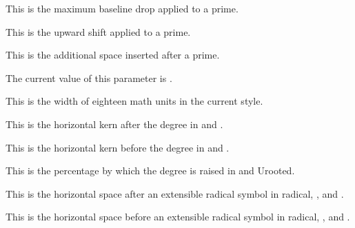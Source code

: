 This is the maximum baseline drop applied to a prime.

\stopnewprimitive

\startnewprimitive[title={\prm {Umathprimeshiftup}}]

This is the upward shift applied to a prime.

\stopnewprimitive

\startnewprimitive[title={\prm {Umathprimespaceafter}}]

This is the additional space inserted after a prime.

\stopnewprimitive

\startnewprimitive[title={\prm {Umathprimevariant}}]

The current value of this parameter is \CurrentMathVariant \Umathprimevariant.

\stopnewprimitive

\startnewprimitive[title={\prm {Umathquad}}]

This is the width of eighteen math units in the current style.

\stopnewprimitive

\startnewprimitive[title={\prm {Umathradicaldegreeafter}}]

This is the horizontal kern after the degree in  and .

\stopnewprimitive

\startnewprimitive[title={\prm {Umathradicaldegreebefore}}]

This is the horizontal kern before the degree in  and .

\stopnewprimitive

\startnewprimitive[title={\prm {Umathradicaldegreeraise}}]

This is the percentage by which the degree is raised in  and \prm
{Urooted}.

\stopnewprimitive

\startnewprimitive[title={\prm {Umathradicalextensibleafter}}]

This is the horizontal space after an extensible radical symbol in \prm
{radical}, ,  and .

\stopnewprimitive

\startnewprimitive[title={\prm {Umathradicalextensiblebefore}}]

This is the horizontal space before an extensible radical symbol in \prm
{radical}, ,  and .

